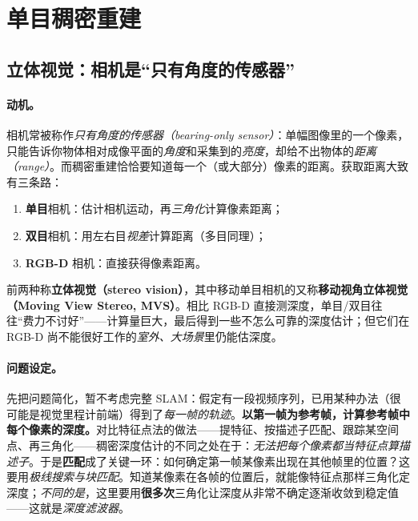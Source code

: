 \section{单目稠密重建}
\label{sec:dense-mono}

\subsection{立体视觉：相机是“只有角度的传感器”}
\label{sec:dense-stereo-entry}

\paragraph{动机。}
相机常被称作\emph{只有角度的传感器（bearing-only sensor）}：单幅图像里的一个像素，只能告诉你物体相对成像平面的\emph{角度}和采集到的\emph{亮度}，却给不出物体的\emph{距离（range）}\cite{gaoxiang2019slam14}。而稠密重建恰恰要知道每一个（或大部分）像素的距离。获取距离大致有三条路：
\begin{enumerate}
  \item \textbf{单目}相机：估计相机运动，再\emph{三角化}计算像素距离；
  \item \textbf{双目}相机：用左右目\emph{视差}计算距离（多目同理）；
  \item \textbf{RGB-D} 相机：直接获得像素距离。
\end{enumerate}
前两种称\textbf{立体视觉（stereo vision）}，其中移动单目相机的又称\textbf{移动视角立体视觉（Moving View Stereo, MVS）}。相比 RGB-D 直接测深度，单目/双目往往“费力不讨好”——计算量巨大，最后得到一些不怎么可靠的深度估计；但它们在 RGB-D 尚不能很好工作的\emph{室外、大场景}里仍能估深度\cite{gaoxiang2019slam14}。

\paragraph{问题设定。}
先把问题简化，暂不考虑完整 SLAM：假定有一段视频序列，已用某种办法（很可能是视觉里程计前端）得到了\emph{每一帧的轨迹}。\textbf{以第一帧为参考帧，计算参考帧中每个像素的深度。}对比特征点法的做法——提特征、按描述子匹配、跟踪某空间点、再三角化——稠密深度估计的不同之处在于：\emph{无法把每个像素都当特征点算描述子}。于是\textbf{匹配}成了关键一环：如何确定第一帧某像素出现在其他帧里的位置？这要用\emph{极线搜索与块匹配}。知道某像素在各帧的位置后，就能像特征点那样三角化定深度；\emph{不同的是}，这里要用\textbf{很多次}三角化让深度从非常不确定逐渐收敛到稳定值——这就是\emph{深度滤波器}\cite{gaoxiang2019slam14}。

